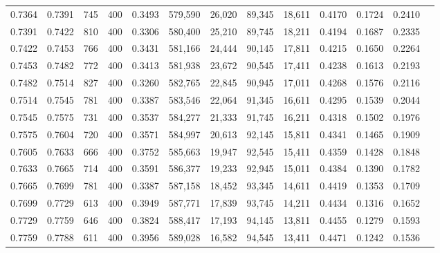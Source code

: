 \begin{tabular}{rrrrrrrrrrrrr}
0.7364 & 0.7391 &    745 & 400 &                                     0.3493 & 579,590 &  26,020 &  89,345 &  18,611 & 0.4170 & 0.1724 & 0.2410 \\
0.7391 & 0.7422 &    810 & 400 &                                     0.3306 & 580,400 &  25,210 &  89,745 &  18,211 & 0.4194 & 0.1687 & 0.2335 \\
0.7422 & 0.7453 &    766 & 400 &                                     0.3431 & 581,166 &  24,444 &  90,145 &  17,811 & 0.4215 & 0.1650 & 0.2264 \\
0.7453 & 0.7482 &    772 & 400 &                                     0.3413 & 581,938 &  23,672 &  90,545 &  17,411 & 0.4238 & 0.1613 & 0.2193 \\
0.7482 & 0.7514 &    827 & 400 &                                     0.3260 & 582,765 &  22,845 &  90,945 &  17,011 & 0.4268 & 0.1576 & 0.2116 \\
0.7514 & 0.7545 &    781 & 400 &                                     0.3387 & 583,546 &  22,064 &  91,345 &  16,611 & 0.4295 & 0.1539 & 0.2044 \\
0.7545 & 0.7575 &    731 & 400 &                                     0.3537 & 584,277 &  21,333 &  91,745 &  16,211 & 0.4318 & 0.1502 & 0.1976 \\
0.7575 & 0.7604 &    720 & 400 &                                     0.3571 & 584,997 &  20,613 &  92,145 &  15,811 & 0.4341 & 0.1465 & 0.1909 \\
0.7605 & 0.7633 &    666 & 400 &                                     0.3752 & 585,663 &  19,947 &  92,545 &  15,411 & 0.4359 & 0.1428 & 0.1848 \\
0.7633 & 0.7665 &    714 & 400 &                                     0.3591 & 586,377 &  19,233 &  92,945 &  15,011 & 0.4384 & 0.1390 & 0.1782 \\
0.7665 & 0.7699 &    781 & 400 &                                     0.3387 & 587,158 &  18,452 &  93,345 &  14,611 & 0.4419 & 0.1353 & 0.1709 \\
0.7699 & 0.7729 &    613 & 400 &                                     0.3949 & 587,771 &  17,839 &  93,745 &  14,211 & 0.4434 & 0.1316 & 0.1652 \\
0.7729 & 0.7759 &    646 & 400 &                                     0.3824 & 588,417 &  17,193 &  94,145 &  13,811 & 0.4455 & 0.1279 & 0.1593 \\
0.7759 & 0.7788 &    611 & 400 &                                     0.3956 & 589,028 &  16,582 &  94,545 &  13,411 & 0.4471 & 0.1242 & 0.1536 \\

\end{tabular}
